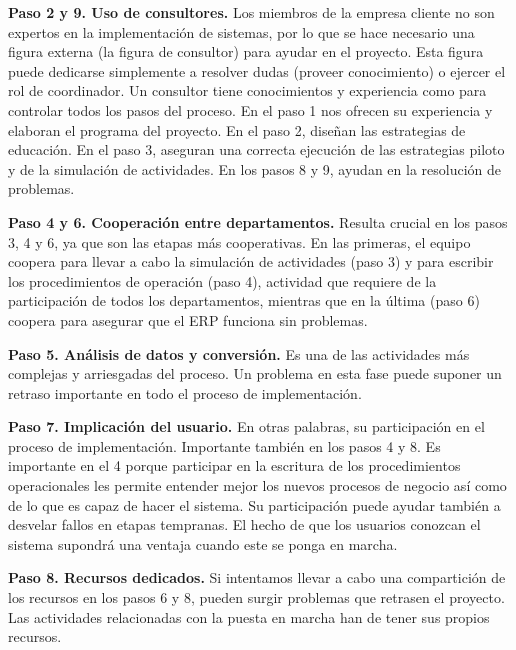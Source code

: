 \documentclass[11pt,a4paper]{article}
\begin{document}
\textbf{Paso 2 y 9. Uso de consultores.} Los miembros de la empresa cliente no son expertos en la implementación de sistemas, por lo que se hace necesario una figura externa (la figura de consultor) para ayudar en el proyecto. Esta figura puede dedicarse simplemente a resolver dudas (proveer conocimiento) o ejercer el rol de coordinador. Un consultor tiene conocimientos y experiencia como para controlar todos los pasos del proceso. En el paso 1 nos ofrecen su experiencia y elaboran el programa del proyecto. En el paso 2, diseñan las estrategias de educación. En el paso 3, aseguran una correcta ejecución de las estrategias piloto y de la simulación de actividades. En los pasos 8 y 9, ayudan en la resolución de problemas.

\textbf{Paso 4 y 6. Cooperación entre departamentos.} Resulta crucial en los pasos 3, 4 y 6, ya que son las etapas más cooperativas. En las primeras, el equipo coopera para llevar a cabo la simulación de actividades (paso 3) y para escribir los procedimientos de operación (paso 4), actividad que requiere de la participación de todos los departamentos, mientras que en la última (paso 6) coopera para asegurar que el ERP funciona sin problemas.

\textbf{Paso 5. Análisis de datos y conversión.} Es una de las actividades más complejas y arriesgadas del proceso. Un problema en esta fase puede suponer un retraso importante en todo el proceso de implementación.

\textbf{Paso 7. Implicación del usuario.} En otras palabras, su participación en el proceso de implementación. Importante también en los pasos 4 y 8. Es importante en el 4 porque participar en la escritura de los procedimientos operacionales les permite entender mejor los nuevos procesos de negocio así como de lo que es capaz de hacer el sistema. Su participación puede ayudar también a desvelar fallos en etapas tempranas. El hecho de que los usuarios conozcan el sistema supondrá una ventaja cuando este se ponga en marcha. 

\textbf{Paso 8. Recursos dedicados.} Si intentamos llevar a cabo una compartición de los recursos en los pasos 6 y 8, pueden surgir problemas que retrasen el proyecto. Las actividades relacionadas con la puesta en marcha han de tener sus propios recursos.
\end{document}
